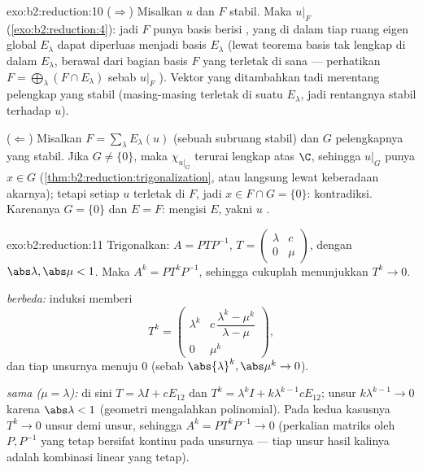 \begin{solution}{exo:b2:reduction:10}
($\Rightarrow$) Misalkan $u$  dan $F$ stabil. Maka
$u|_F$  (\cref{exo:b2:reduction:4}): jadi $F$ punya
basis berisi , yang di dalam tiap ruang eigen global
$E_\lambda$ dapat diperluas menjadi basis $E_\lambda$ (lewat teorema
basis tak lengkap di dalam $E_\lambda$, berawal dari bagian basis $F$
yang terletak di sana --- perhatikan $F = \bigoplus_\lambda (F \cap
E_\lambda)$ sebab $u|_F$ ). Vektor yang ditambahkan
tadi merentang pelengkap yang stabil (masing-masing terletak di suatu
$E_\lambda$, jadi rentangnya stabil terhadap $u$).

($\Leftarrow$) Misalkan $F = \sum_\lambda E_\lambda(u)$ (sebuah subruang
stabil) dan $G$ pelengkapnya yang stabil. Jika $G \neq \{0\}$, maka
$\chi_{u|_G}$ terurai lengkap atas $\C$, sehingga $u|_G$ punya  $x \in G$ (\cref{thm:b2:reduction:trigonalization}, atau langsung
lewat keberadaan akarnya); tetapi setiap  $u$ terletak di
$F$, jadi $x \in F \cap G = \{0\}$: kontradiksi. Karenanya $G = \{0\}$
dan $E = F$:  mengisi $E$, yakni $u$ .
\end{solution}

\begin{solution}{exo:b2:reduction:11}
Trigonalkan: $A = PTP^{-1}$, $T = \begin{pmatrix} \lambda & c\\ 0 &
\mu\end{pmatrix}$, dengan $\abs\lambda, \abs\mu < 1$. Maka $A^k =
PT^kP^{-1}$, sehingga cukuplah menunjukkan $T^k \to 0$.

\emph{ berbeda:} induksi memberi
\[
T^k = \begin{pmatrix}
\lambda^k & c\,\dfrac{\lambda^k - \mu^k}{\lambda - \mu}\\[4pt]
0 & \mu^k
\end{pmatrix},
\]
dan tiap unsurnya menuju $0$ (sebab $\abs{\lambda}^k, \abs\mu^k \to 0$).

\emph{ sama ($\mu = \lambda$):} di sini $T = \lambda I + cE_{12}$
dan $T^k = \lambda^k I + k\lambda^{k-1}cE_{12}$; unsur
$k\lambda^{k-1} \to 0$ karena $\abs\lambda < 1$ (geometri mengalahkan
polinomial). Pada kedua kasusnya $T^k \to 0$ unsur demi unsur, sehingga
$A^k = PT^kP^{-1} \to 0$ (perkalian matriks oleh $P, P^{-1}$ yang tetap
bersifat kontinu pada unsurnya --- tiap unsur hasil kalinya adalah
kombinasi linear yang tetap).
\end{solution}

